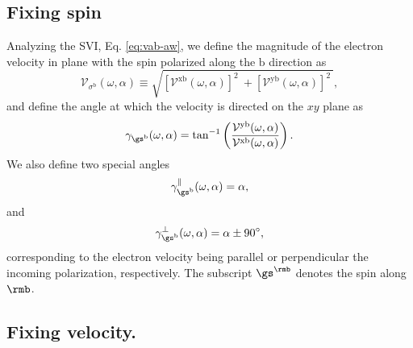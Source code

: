 \documentclass[prb,11pt,tightenlines,twocolumn,aps]{revtex4-1}
\begin{document}
\subsection{Fixing spin}\label{sec:theory-fixspin}

Analyzing the SVI, Eq. \eqref{eq:vab-aw}, we define the magnitude of
the electron velocity in plane
with the spin polarized along the $\mathrm{b}$ direction as
\begin{equation}
\mathcal{V}_{\sigma^{\mathrm{b}}}(\omega,\alpha)
\equiv
\sqrt{
[\mathcal{V}^{\mathrm{xb}}(\omega,\alpha)]^{2}\ +
[\mathcal{V}^{\mathrm{yb}}(\omega,\alpha)]^{2}\ 
}, 
\label{eq:vs-mag}
\end{equation}
and define the angle at which the velocity is directed on the $xy$ plane as
\begin{equation}
\gamma_{\gs^\mathrm{b}} (\omega,\alpha)
=
\tan^{-1} \left( \frac{\mathcal{V}^{\mathrm{yb}}(\omega,\alpha)}
{\mathcal{V}^{\mathrm{xb}}(\omega,\alpha)} \right)
.
\label{eq:gamma-ang}
\end{equation}
We also define two special angles
\begin{equation}
\gamma_{\gs^\mathrm{b}}^\parallel(\omega,\alpha) = \alpha, 
\label{eq:gamma-par} 
\end{equation}
and
\begin{equation}
\gamma_{\gs^\mathrm{b}}^\perp(\omega,\alpha) = \alpha \pm 90^{\circ},
\label{eq:gamma-perp}
\end{equation}
corresponding to the electron velocity being parallel or perpendicular
the incoming polarization, 
respectively. The subscript $\gs^\rmb$ denotes the spin along $\rmb$.



\subsection{Fixing velocity.}\label{sec:theory-fixvel}
\end{document}
